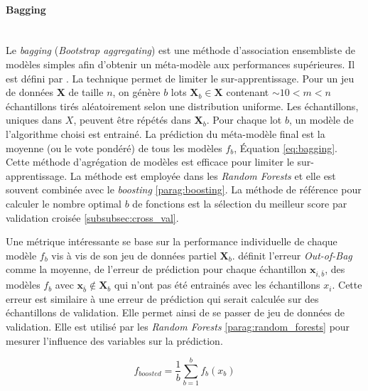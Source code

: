 
\paragraph{Bagging}\mbox{\label{parag:bagging}} \\
Le \textit{bagging} (\textit{\emph{B}ootstrap \emph{agg}regat\emph{ing}}) est une méthode d'association ensembliste de modèles simples afin d'obtenir un méta-modèle aux performances supérieures.
Il est défini par \cite{breiman_bagging_1996}.
La technique permet de limiter le sur-apprentissage.
Pour un jeu de données $\mathbf{X}$ de taille $n$, on génère $b$ lots $\mathbf{X}_b \in \mathbf{X}$ contenant $\sim 10 < m < n$ échantillons tirés aléatoirement selon une distribution uniforme.
Les échantillons, uniques dans $X$, peuvent être répétés dans $\mathbf{X}_b$.
Pour chaque lot $b$, un modèle de l'algorithme choisi est entrainé.
La prédiction du méta-modèle final est la moyenne (ou le vote pondéré) de tous les modèles $f_b$, Équation \ref{eq:bagging}.
Cette méthode d'agrégation de modèles est efficace pour limiter le sur-apprentissage.
La méthode est employée dans les \textit{Random Forests} et elle est souvent combinée avec le \textit{boosting} \ref{parag:boosting}.
La méthode de référence pour calculer le nombre optimal $b$ de fonctions est la sélection du meilleur score par validation croisée \ref{subsubsec:cross_val}.

Une métrique intéressante se base sur la performance individuelle de chaque modèle $f_b$ vis à vis de son jeu de données partiel $\mathbf{X}_b$.
\cite{breiman_bagging_1996} définit l'erreur \textit{Out-of-Bag} comme la moyenne, de l'erreur de prédiction pour chaque échantillon $\mathbf{x}_{i,\bar{b}}$, des modèles $f_b$ avec $ \mathbf{x}_{\bar{b}} \notin \mathbf{X}_b$ qui n'ont pas été entrainés avec les échantillons $x_i$.
Cette erreur est similaire à une erreur de prédiction qui serait calculée sur des échantillons de validation.
Elle permet ainsi de se passer de jeu de données de validation.
Elle est utilisé par les \textit{Random Forests} \ref{parag:random_forests} pour mesurer l'influence des variables sur la prédiction.

\begin{equation} \label{eq:bagging}
f_{boosted} = \frac{1}{b} \sum_{b=1}^{b} f_{b}\left(x_b\right)
\end{equation}

